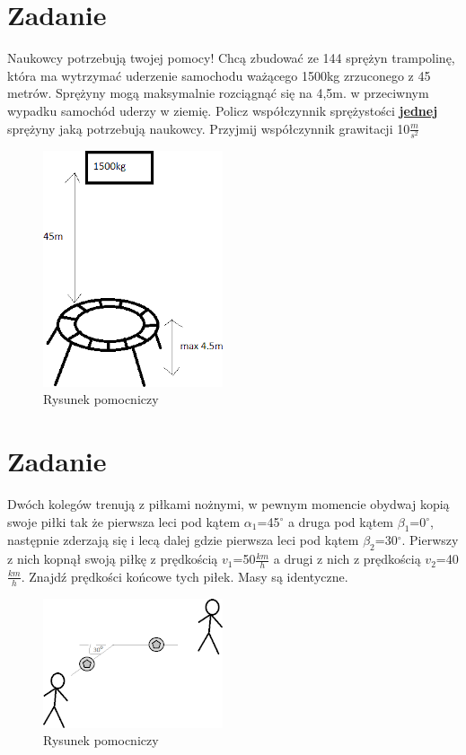 \documentclass[14pt]{extarticle}
\begin{document}
    \section{Zadanie}
    \begin{flushleft}
        Naukowcy potrzebują twojej pomocy! Chcą zbudować ze 144 sprężyn trampolinę, która ma wytrzymać uderzenie samochodu ważącego 1500kg zrzuconego z 45 metrów.
        Sprężyny mogą maksymalnie rozciągnąć się na 4,5m. w przeciwnym wypadku samochód uderzy w ziemię.
        Policz współczynnik sprężystości \textbf{\underline{jednej}} sprężyny jaką potrzebują naukowcy.
        Przyjmij współczynnik grawitacji 10$\frac{m}{s^2}$
    \end{flushleft}
    \begin{figure}[H]
        \centering
        \includegraphics{trampolina}
        \caption{Rysunek pomocniczy}
    \end{figure}
    \clearpage
    \section{Zadanie}
    \begin{flushleft}
        Dwóch kolegów trenują z piłkami nożnymi, w pewnym momencie obydwaj kopią swoje piłki tak że pierwsza leci pod kątem $\alpha _1$=45$^\circ$ a druga pod kątem $\beta _1$=0$^\circ$,
        następnie zderzają się i lecą dalej gdzie pierwsza leci pod kątem $\beta _2$=30$^\circ$.
        Pierwszy z nich kopnął swoją piłkę z prędkością $v_1$=50$\frac{km}{h}$ a drugi z nich z prędkością $v_2$=40$\frac{km}{h}$.
        Znajdź prędkości końcowe tych piłek. Masy są identyczne.
    \end{flushleft}
    \begin{figure}[H]
        \centering
        \includegraphics{pilki}
        \caption{Rysunek pomocniczy}
    \end{figure}
    \clearpage
\end{document}
